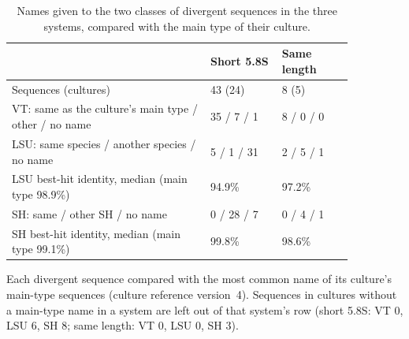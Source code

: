 \begin{table}[htbp]\centering
\begin{threeparttable}
\caption{Names given to the two classes of divergent sequences in the three systems, compared with the main type of their culture.}
\label{tab:divergent}
\small
\begin{tabular}{p{0.50\linewidth}p{0.18\linewidth}p{0.18\linewidth}}
\toprule
 & Short 5.8S & Same length\\
\midrule
Sequences (cultures) & 43 (24) & 8 (5)\\
VT: same as the culture's main type / other / no name & 35 / 7 / 1 & 8 / 0 / 0\\
LSU: same species / another species / no name & 5 / 1 / 31 & 2 / 5 / 1\\
LSU best-hit identity, median (main type 98.9\%) & 94.9\% & 97.2\%\\
SH: same / other SH / no name & 0 / 28 / 7 & 0 / 4 / 1\\
SH best-hit identity, median (main type 99.1\%) & 99.8\% & 98.6\%\\
\bottomrule
\end{tabular}
\begin{tablenotes}\footnotesize
\item Each divergent sequence compared with the most common name of its culture's main-type sequences (culture
reference version~4). Sequences in cultures without a main-type name in a system are left out of that
system's row (short 5.8S: VT 0, LSU 6, SH 8;
same length: VT 0, LSU 0, SH 3).
\end{tablenotes}
\end{threeparttable}
\end{table}
